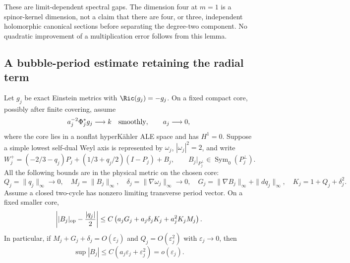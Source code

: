 These are limit-dependent spectral gaps.  The dimension four at
$m=1$ is a spinor-kernel dimension, not a claim that there are four,
or three, independent holomorphic canonical sections before separating
the degree-two component.  No quadratic improvement of a multiplication
error follows from this lemma.

\subsection{A bubble-period estimate retaining the radial term}

\begin{proposition}\label{prop:eqg-bubble-period}
Let $g_j$ be exact Einstein metrics with $\Ric(g_j)=-g_j$.
On a fixed compact core, possibly after finite covering, assume
\[
 a_j^{-2}\Phi_j^*g_j\longrightarrow k\quad\hbox{smoothly},
 \qquad a_j\longrightarrow0,
\]
where the core lies in a nonflat hyperKähler ALE space and has
$H^1=0$.  Suppose a simple lowest self-dual Weyl axis is represented
by $\omega_j$, $|\omega_j|^2=2$, and write
\[
 W_j^+=(-2/3-q_j)P_j+(1/3+q_j/2)(I-P_j)+B_j,
 \qquad B_j|_{P_j^\perp}\in\operatorname{Sym}_0(P_j^\perp).
\]
All the following bounds are in the physical metric on the chosen
core:
\[
 Q_j=\|q_j\|_\infty\to0,\quad
 M_j=\|B_j\|_\infty,\quad
 \delta_j=\|\nabla\omega_j\|_\infty\to0,\quad
 G_j=\|\nabla B_j\|_\infty+\|dq_j\|_\infty,
 \quad K_j=1+Q_j+\delta_j^2.
\]
Assume a closed two-cycle has nonzero limiting transverse period
vector.  On a fixed smaller core,
\begin{equation}\label{eq:eqg-bubble-period}
 \left||B_j|_{\rm op}-\frac{|q_j|}{2}\right|
 \leq C\left(a_jG_j+a_j\delta_jK_j+a_j^2K_jM_j\right).
\end{equation}
In particular, if $M_j+G_j+\delta_j=O(\varepsilon_j)$ and
$Q_j=O(\varepsilon_j^2)$ with $\varepsilon_j\to0$, then
\begin{equation}\label{eq:eqg-bubble-vanishing}
 \sup|B_j|\leq C(a_j\varepsilon_j+\varepsilon_j^2)
 =o(\varepsilon_j).
\end{equation}
\end{proposition}

